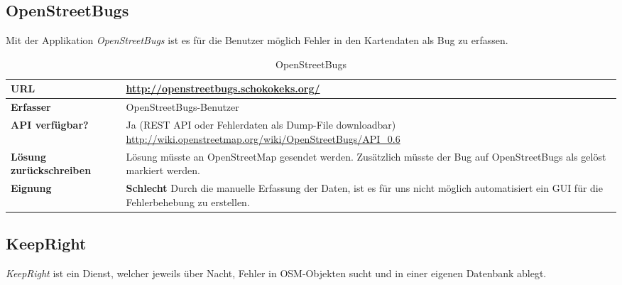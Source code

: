 \subsection{OpenStreetBugs}
Mit der Applikation \emph{OpenStreetBugs} ist es für die Benutzer möglich Fehler in den Kartendaten als Bug zu erfassen.

\begin{table}[H]
\centering
\begin{tabular}{|p{0.3\twocelltabwidth}|p{0.7\twocelltabwidth}|}
\hline 
\small{\textbf{URL}} & \url{http://openstreetbugs.schokokeks.org/} \\
\hline 
\small{\textbf{Erfasser}} & OpenStreetBugs-Benutzer \\
\hline 
\small{\textbf{API verfügbar?}} & Ja (\gls{REST} \gls{API} oder Fehlerdaten als Dump-File downloadbar) \newline
\url{http://wiki.openstreetmap.org/wiki/OpenStreetBugs/API_0.6} \\
\hline 
\small{\textbf{Lösung zurückschreiben}} & Lösung müsste an \gls{OpenStreetMap} gesendet werden. Zusätzlich  müsste der Bug auf OpenStreetBugs als gelöst markiert werden. \\
\hline
\small{\textbf{Eignung}} & \textbf{Schlecht} \linebreak Durch die manuelle Erfassung der Daten, ist es für uns nicht möglich automatisiert ein GUI für die Fehlerbehebung zu erstellen. \\ 
\hline 
\end{tabular} 
\caption{OpenStreetBugs}
\label{datenquellen-openstreetbugs}
\end{table}

\subsection{KeepRight}
\emph{KeepRight} ist ein Dienst, welcher jeweils über Nacht, Fehler in OSM-Objekten sucht und in einer eigenen Datenbank ablegt.

